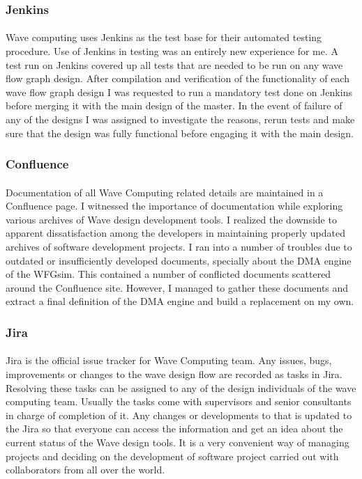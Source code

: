 \subsubsection{Jenkins}
\paragraph{}
Wave computing uses Jenkins as the test base for their automated testing procedure. Use of Jenkins in testing was an entirely new experience for me. A test run on Jenkins covered up all tests that are needed to be run on any wave flow graph design. After compilation and verification of the functionality of each wave flow graph design I was requested to run a mandatory test done on Jenkins before merging it with the main design of the master. In the event of failure of any of the designs I was assigned to investigate the reasons, rerun tests and make sure that the design was fully functional before engaging it with the main design. 

\subsubsection{Confluence}
\paragraph{}
Documentation of all Wave Computing related details are maintained in a Confluence page. I witnessed the importance of documentation while exploring various archives of Wave design development tools. I realized the downside to apparent dissatisfaction among the developers in maintaining properly updated archives of software development projects. I ran into a number of troubles due to outdated or insufficiently developed documents, specially about the DMA engine of the WFGsim. This contained a number of conflicted documents scattered around the Confluence site. However, I managed to gather these documents and extract a final definition of the DMA engine and build a replacement on my own.

\subsubsection{Jira}
\paragraph{}
Jira is the official issue tracker for Wave Computing team. Any issues, bugs, improvements or changes to the wave design flow are recorded as tasks in Jira. Resolving these tasks can be assigned to any of the design individuals of the wave computing team. Usually the tasks come with supervisors and senior consultants in charge of completion of it. Any changes or developments to that is updated to the Jira so that everyone can access the information and get an idea about the current status of the Wave design tools. It is a very convenient way of managing projects and deciding on the development of software project carried out with collaborators from all over the world. 

